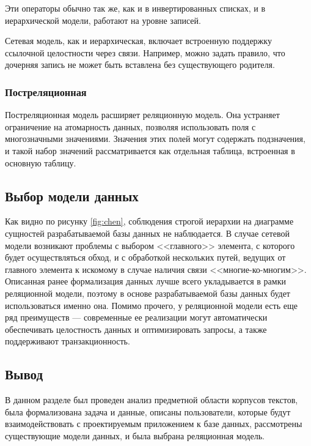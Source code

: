 Эти операторы обычно так же, как и в инвертированных списках, и в иерархической модели, работают на уровне записей.

Сетевая модель, как и иерархическая, включает встроенную поддержку ссылочной целостности через связи.
Например, можно задать правило, что дочерняя запись не может быть вставлена без существующего родителя.~\cite[с. 452]{date-wr}

\subsubsection{Постреляционная}

Постреляционная модель расширяет реляционную модель.
Она устраняет ограничение на атомарность данных, позволяя использовать поля с многозначными значениями.
Значения этих полей могут содержать подзначения, и такой набор значений рассматривается как отдельная таблица, встроенная в основную таблицу.~\cite{lecnotes} %

\subsection{Выбор модели данных}

Как видно по рисунку \ref{fig:chen}, соблюдения строгой иерархии на диаграмме сущностей разрабатываемой базы данных не наблюдается.
В случае сетевой модели возникают проблемы с выбором <<главного>> элемента, с которого будет осуществляться обход, и с обработкой нескольких путей, ведущих от главного элемента к искомому в случае наличия связи <<многие-ко-многим>>.
Описанная ранее формализация данных лучше всего укладывается в рамки реляционной модели, поэтому в основе разрабатываемой базы данных будет использоваться именно она.
Помимо прочего, у реляционной модели есть еще ряд преимуществ --- современные ее реализации могут автоматически обеспечивать целостность данных и оптимизировать запросы, а также поддерживают транзакционность.

\subsection*{Вывод}

В данном разделе был проведен анализ предметной области корпусов текстов, была формализована задача и данные, описаны пользователи, которые будут взаимодействовать с проектируемым приложением к базе данных, рассмотрены существующие модели данных, и была выбрана реляционная модель.
